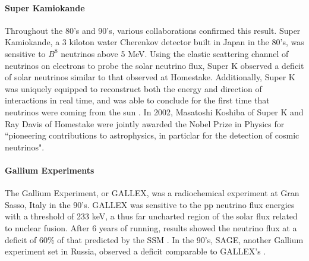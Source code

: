 \paragraph{Super Kamiokande}
Throughout the 80's and 90's, various collaborations confirmed this result. Super Kamiokande, a 3 kiloton water Cherenkov detector built in Japan in the 80's, was sensitive to $B^8$ neutrinos above 5 MeV. Using the elastic scattering channel of neutrinos on electrons to probe the solar neutrino flux, Super K observed a deficit of solar neutrinos similar to that observed at Homestake. Additionally, Super K was uniquely equipped to reconstruct both the energy and direction of interactions in real time, and was able to conclude for the first time that neutrinos were coming from the sun \cite{bib:kam0}. In 2002, Masatoshi Koshiba of Super K and Ray Davis of Homestake were jointly awarded the Nobel Prize in Physics for ``pioneering contributions to astrophysics, in particlar for the detection of cosmic neutrinos".

\paragraph{Gallium Experiments}
The Gallium Experiment, or GALLEX, was a radiochemical experiment at Gran Sasso, Italy in the 90's. GALLEX was sensitive to the pp neutrino flux energies with a threshold of 233 keV, a thus far uncharted region of the solar flux related to nuclear fusion. After 6 years of running, results showed the neutrino flux at a deficit of 60\% of that predicted by the SSM \cite{bib:gal0}. In the 90's, SAGE, another Gallium experiment set in Russia, observed a deficit comparable to GALLEX's \cite{bib:sage}.    

